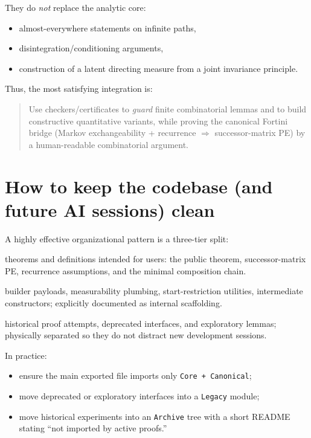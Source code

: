 \documentclass[11pt]{article}
\begin{document}
They do \emph{not} replace the analytic core:
\begin{itemize}[leftmargin=2em]
\item almost-everywhere statements on infinite paths,
\item disintegration/conditioning arguments,
\item construction of a latent directing measure from a joint invariance principle.
\end{itemize}

Thus, the most satisfying integration is:
\begin{quote}
Use checkers/certificates to \emph{guard} finite combinatorial lemmas and to build constructive quantitative variants,
while proving the canonical Fortini bridge (Markov exchangeability + recurrence \(\Rightarrow\) successor-matrix PE) by a human-readable combinatorial argument.
\end{quote}

\section{How to keep the codebase (and future AI sessions) clean}

A highly effective organizational pattern is a three-tier split:
\begin{description}[leftmargin=2.8em,style=nextline]
\item[Canonical] theorems and definitions intended for users: the public theorem, successor-matrix PE, recurrence assumptions, and the minimal composition chain.
\item[Internal] builder payloads, measurability plumbing, start-restriction utilities, intermediate constructors; explicitly documented as internal scaffolding.
\item[Legacy/Archive] historical proof attempts, deprecated interfaces, and exploratory lemmas; physically separated so they do not distract new development sessions.
\end{description}

In practice:
\begin{itemize}[leftmargin=2em]
\item ensure the main exported file imports only \texttt{Core + Canonical};
\item move deprecated or exploratory interfaces into a \texttt{Legacy} module;
\item move historical experiments into an \texttt{Archive} tree with a short README stating ``not imported by active proofs.''
\end{itemize}
\end{document}
